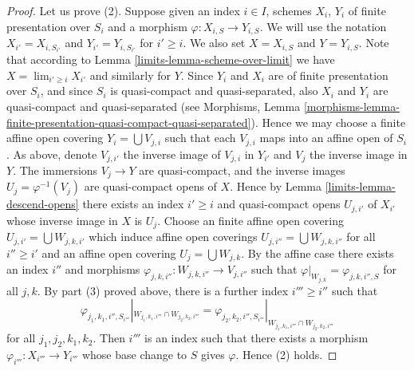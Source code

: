 \begin{proof}
\medskip\noindent
Let us prove (2). Suppose given an index $i \in I$, schemes
$X_i$, $Y_i$ of finite presentation over $S_i$ and a morphism
$\varphi : X_{i, S} \to Y_{i, S}$. We will use the notation
$X_{i'} = X_{i, S_{i'}}$ and $Y_{i'} = Y_{i, S_{i'}}$ for
$i' \geq i$. We also set $X = X_{i, S}$ and $Y = Y_{i, S}$.
Note that according to Lemma \ref{limits-lemma-scheme-over-limit} we have
$X = \lim_{i' \geq i} X_{i'}$ and similarly for $Y$.
Since $Y_i$ and $X_i$ are of finite presentation
over $S_i$, and since $S_i$ is quasi-compact and quasi-separated, also
$X_i$ and $Y_i$ are quasi-compact and quasi-separated
(see Morphisms,
Lemma \ref{morphisms-lemma-finite-presentation-quasi-compact-quasi-separated}).
Hence we may choose a finite affine open covering
$Y_i = \bigcup V_{j, i}$ such that each $V_{j, i}$ maps into
an affine open of $S_i$. As above, denote $V_{j, i'}$ the inverse
image of $V_{j, i}$ in $Y_{i'}$ and $V_j$ the inverse image in $Y$.
The immersions $V_j \to Y$ are quasi-compact, and the inverse images
$U_j = \varphi^{-1}(V_j)$ are quasi-compact opens of $X$.
Hence by Lemma \ref{limits-lemma-descend-opens} there exists an index
$i' \geq i$ and quasi-compact opens $U_{j, i'}$ of $X_{i'}$
whose inverse image in $X$ is $U_j$. Choose an finite affine open covering
$U_{j, i'} = \bigcup W_{j, k, i'}$ which induce affine open
coverings $U_{j, i''} = \bigcup W_{j, k, i''}$
for all $i'' \geq i'$ and an affine open covering
$U_j = \bigcup W_{j, k}$. By the affine case there exists
an index $i''$ and morphisms
$\varphi_{j, k, i''} : W_{j, k, i''} \to V_{j, i''}$
such that
$\varphi|_{W_{j, k}} = \varphi_{j, k, i'', S}$ for all $j, k$.
By part (3) proved above, there is a further index $i''' \geq i''$
such that
$$
\varphi_{j_1, k_1, i'', S_{i'''}}|_{W_{j_1, k_1, i'''} \cap W_{j_2, k_2, i'''}}
=
\varphi_{j_2, k_2, i'', S_{i'''}}|_{W_{j_1, k_1, i'''} \cap W_{j_2, k_2, i'''}}
$$
for all $j_1, j_2, k_1, k_2$. Then $i'''$ is an index such that
there exists a morphism $\varphi_{i'''} : X_{i'''} \to Y_{i'''}$
whose base change to $S$ gives $\varphi$. Hence (2) holds.


\end{proof}
